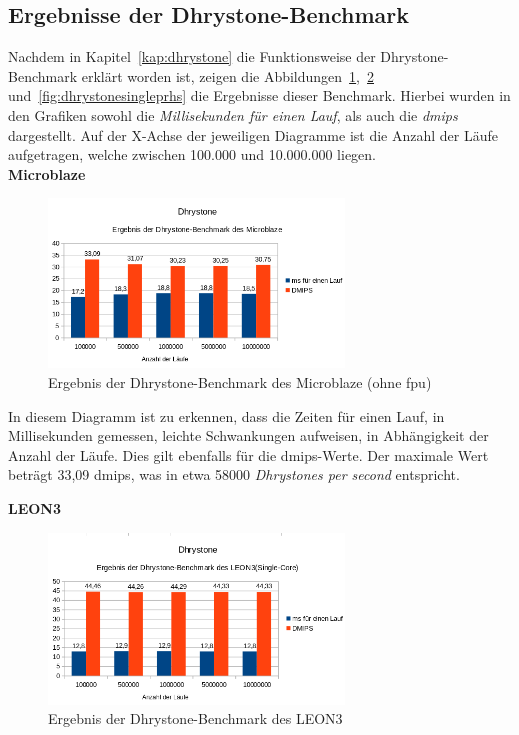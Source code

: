 \subsection{Ergebnisse der Dhrystone-Benchmark}\label{kap:dhrystonetest}

Nachdem in Kapitel~\ref{kap:dhrystone} die Funktionsweise der Dhrystone-Benchmark erklärt worden ist, zeigen die Abbildungen~\ref{fig:dhrystonembohnefpu},~\ref{fig:dhrystonesingleleon3} und~\ref{fig:dhrystonesingleprhs} die Ergebnisse
dieser Benchmark. Hierbei wurden in den Grafiken sowohl die \emph{Millisekunden für einen Lauf}, als auch die \emph{\ac{dmips}} dargestellt. Auf der X-Achse der jeweiligen Diagramme ist die Anzahl
der Läufe aufgetragen, welche zwischen 100.000 und 10.000.000 liegen.\\

\textbf{Microblaze}

\begin{figure}[H]
\centering
\includegraphics[width=0.7\textwidth]{Hauptteil/dhrystonembohnefpu.png}
\caption{Ergebnis der Dhrystone-Benchmark des Microblaze (ohne \ac{fpu})}
\label{fig:dhrystonembohnefpu}
\end{figure}

In diesem Diagramm ist zu erkennen, dass die Zeiten für einen Lauf, in Millisekunden gemessen, leichte Schwankungen aufweisen, in Abhängigkeit der Anzahl der Läufe. Dies gilt ebenfalls für
die \ac{dmips}-Werte. Der maximale Wert beträgt 33,09 \ac{dmips}, was in etwa 58000 \emph{Dhrystones per second} entspricht.

\textbf{LEON3}

\begin{figure}[H]
\centering
\includegraphics[width=0.7\textwidth]{Hauptteil/dhrystonesingleleon3.png}
\caption{Ergebnis der Dhrystone-Benchmark des LEON3}
\label{fig:dhrystonesingleleon3}
\end{figure}

